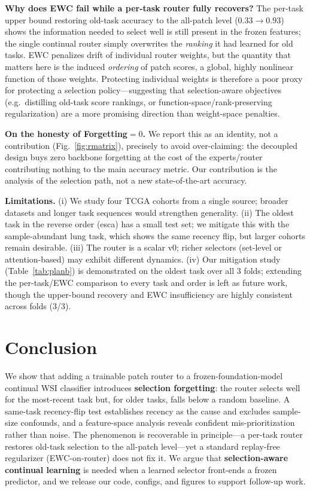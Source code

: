 \noindent\textbf{Why does EWC fail while a per-task router fully recovers?} The
per-task upper bound restoring old-task accuracy to the all-patch level
($0.33\to0.93$) shows the information needed to select well is still present in
the frozen features; the single continual router simply overwrites the
\emph{ranking} it had learned for old tasks. EWC penalizes drift of individual
router weights, but the quantity that matters here is the induced \emph{ordering}
of patch scores, a global, highly nonlinear function of those weights.
Protecting individual weights is therefore a poor proxy for protecting a
selection policy---suggesting that selection-aware objectives (e.g.\ distilling
old-task score rankings, or function-space/rank-preserving regularization) are a
more promising direction than weight-space penalties.

\noindent\textbf{On the honesty of Forgetting$=0$.} We report this as an
identity, not a contribution (Fig.~\ref{fig:rmatrix}), precisely to avoid
over-claiming: the decoupled design buys zero backbone forgetting at the cost of
the experts/router contributing nothing to the main accuracy metric. Our
contribution is the analysis of the selection path, not a new state-of-the-art
accuracy.

\noindent\textbf{Limitations.} (i) We study four TCGA cohorts from a single
source; broader datasets and longer task sequences would strengthen generality.
(ii) The oldest task in the reverse order (esca) has a small test set; we
mitigate this with the sample-abundant lung task, which shows the same recency
flip, but larger cohorts remain desirable. (iii) The router is a scalar v0;
richer selectors (set-level or attention-based) may exhibit different dynamics.
(iv) Our mitigation study (Table~\ref{tab:planb}) is demonstrated on the oldest
task over all 3 folds; extending the per-task/EWC comparison to every task and
order is left as future work, though the upper-bound recovery and EWC
insufficiency are highly consistent across folds (3/3).

\section{Conclusion}
\label{sec:conclusion}
We show that adding a trainable patch router to a frozen-foundation-model
continual WSI classifier introduces \textbf{selection forgetting}: the router
selects well for the most-recent task but, for older tasks, falls below a random
baseline. A same-task recency-flip test establishes recency as the cause and
excludes sample-size confounds, and a feature-space analysis reveals confident
mis-prioritization rather than noise. The phenomenon is recoverable in
principle---a per-task router restores old-task selection to the all-patch
level---yet a standard replay-free regularizer (EWC-on-router) does not fix it.
We argue that \textbf{selection-aware continual learning} is needed when a
learned selector front-ends a frozen predictor, and we release our code,
configs, and figures to support follow-up work.

